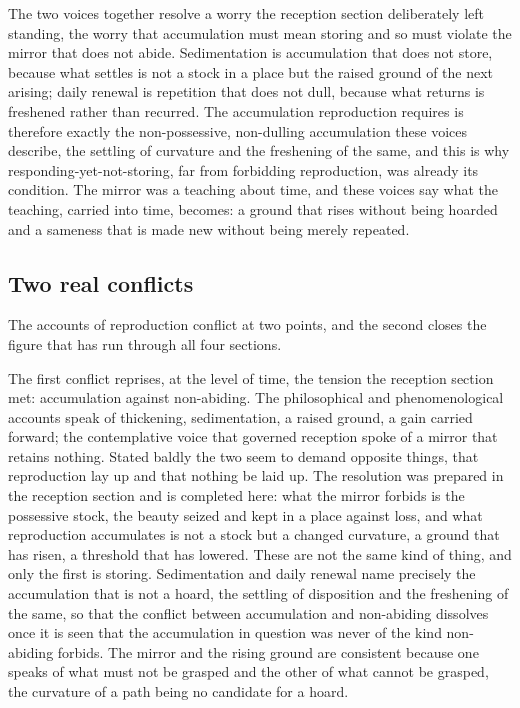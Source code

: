 The two voices together resolve a worry the reception section deliberately left standing, the worry that accumulation must mean storing and so must violate the mirror that does not abide. Sedimentation is accumulation that does not store, because what settles is not a stock in a place but the raised ground of the next arising; daily renewal is repetition that does not dull, because what returns is freshened rather than recurred. The accumulation reproduction requires is therefore exactly the non-possessive, non-dulling accumulation these voices describe, the settling of curvature and the freshening of the same, and this is why responding-yet-not-storing, far from forbidding reproduction, was already its condition. The mirror was a teaching about time, and these voices say what the teaching, carried into time, becomes: a ground that rises without being hoarded and a sameness that is made new without being merely repeated.

\subsection{Two real conflicts}
\label{p22:sub:reproduction-conflicts}

The accounts of reproduction conflict at two points, and the second closes the figure that has run through all four sections.

The first conflict reprises, at the level of time, the tension the reception section met: accumulation against non-abiding. The philosophical and phenomenological accounts speak of thickening, sedimentation, a raised ground, a gain carried forward; the contemplative voice that governed reception spoke of a mirror that retains nothing. Stated baldly the two seem to demand opposite things, that reproduction lay up and that nothing be laid up. The resolution was prepared in the reception section and is completed here: what the mirror forbids is the possessive stock, the beauty seized and kept in a place against loss, and what reproduction accumulates is not a stock but a changed curvature, a ground that has risen, a threshold that has lowered. These are not the same kind of thing, and only the first is storing. Sedimentation and daily renewal name precisely the accumulation that is not a hoard, the settling of disposition and the freshening of the same, so that the conflict between accumulation and non-abiding dissolves once it is seen that the accumulation in question was never of the kind non-abiding forbids. The mirror and the rising ground are consistent because one speaks of what must not be grasped and the other of what cannot be grasped, the curvature of a path being no candidate for a hoard.

